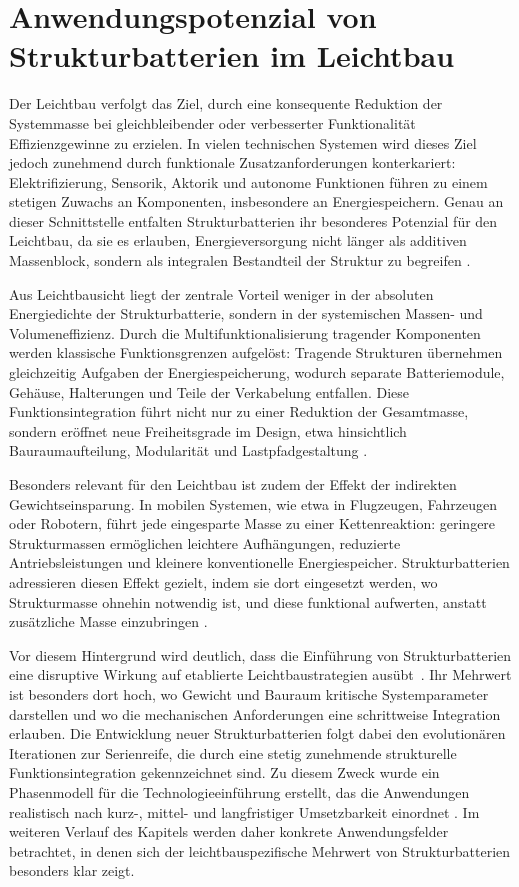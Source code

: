 \chapter{Anwendungspotenzial von Strukturbatterien im Leichtbau}\label{sec:lightweight_applications}

Der Leichtbau verfolgt das Ziel, durch eine konsequente Reduktion der Systemmasse bei gleichbleibender oder verbesserter Funktionalität Effizienzgewinne zu erzielen. In vielen technischen Systemen wird dieses Ziel jedoch zunehmend durch funktionale Zusatzanforderungen konterkariert: Elektrifizierung, Sensorik, Aktorik und autonome Funktionen führen zu einem stetigen Zuwachs an Komponenten, insbesondere an Energiespeichern. Genau an dieser Schnittstelle entfalten Strukturbatterien ihr besonderes Potenzial für den Leichtbau, da sie es erlauben, Energieversorgung nicht länger als additiven Massenblock, sondern als integralen Bestandteil der Struktur zu begreifen \cite{Yang2020,Asp2021a}.

Aus Leichtbausicht liegt der zentrale Vorteil weniger in der absoluten Energiedichte der Strukturbatterie, sondern in der systemischen Massen- und Volumeneffizienz. Durch die Multifunktionalisierung tragender Komponenten werden klassische Funktionsgrenzen aufgelöst: Tragende Strukturen übernehmen gleichzeitig Aufgaben der Energiespeicherung, wodurch separate Batteriemodule, Gehäuse, Halterungen und Teile der Verkabelung entfallen. Diese Funktionsintegration führt nicht nur zu einer Reduktion der Gesamtmasse, sondern eröffnet neue Freiheitsgrade im Design, etwa hinsichtlich Bauraumaufteilung, Modularität und Lastpfadgestaltung \cite{Danzi2021,Johannisson2019}.

Besonders relevant für den Leichtbau ist zudem der Effekt der indirekten Gewichtseinsparung. In mobilen Systemen, wie etwa in Flugzeugen, Fahrzeugen oder Robotern, führt jede eingesparte Masse zu einer Kettenreaktion: geringere Strukturmassen ermöglichen leichtere Aufhängungen, reduzierte Antriebsleistungen und kleinere konventionelle Energiespeicher. Strukturbatterien adressieren diesen Effekt gezielt, indem sie dort eingesetzt werden, wo Strukturmasse ohnehin notwendig ist, und diese funktional aufwerten, anstatt zusätzliche Masse einzubringen \cite{Johannisson2019}. 

Vor diesem Hintergrund wird deutlich, dass die Einführung von Strukturbatterien eine disruptive Wirkung auf etablierte Leichtbaustrategien ausübt~\cite{WEF2025EmergingTech}. Ihr Mehrwert ist besonders dort hoch, wo Gewicht und Bauraum kritische Systemparameter darstellen und wo die mechanischen Anforderungen eine schrittweise Integration erlauben. Die Entwicklung neuer Strukturbatterien folgt dabei den evolutionären Iterationen zur Serienreife, die durch eine stetig zunehmende strukturelle Funktionsintegration gekennzeichnet sind. Zu diesem Zweck wurde ein Phasenmodell für die Technologieeinführung erstellt, das die Anwendungen realistisch nach kurz-, mittel- und langfristiger Umsetzbarkeit einordnet \cite{Kuehnelt2021}. Im weiteren Verlauf des Kapitels werden daher konkrete Anwendungsfelder betrachtet, in denen sich der leichtbauspezifische Mehrwert von Strukturbatterien besonders klar zeigt.


